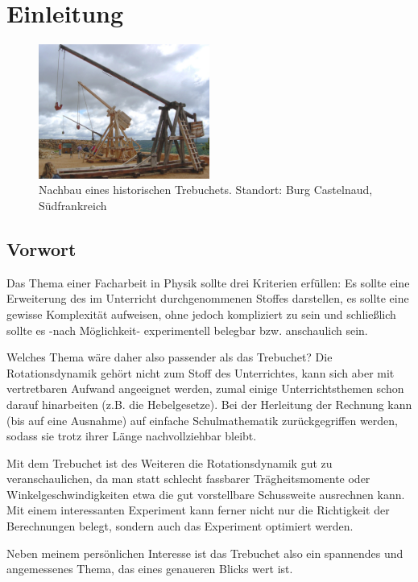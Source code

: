 \chapter{Einleitung}
\begin{figure}[h!]
	\centering
    \includegraphics[width=0.5\textwidth]{bilder/Trebuchet_Castelnaud}
    \caption{Nachbau eines historischen Trebuchets. Standort: Burg Castelnaud, Südfrankreich}
    \label{bild_trebuchet}
\end{figure}

\section{Vorwort}
Das Thema einer Facharbeit in Physik sollte drei Kriterien erfüllen: Es sollte eine Erweiterung des im Unterricht durchgenommenen Stoffes darstellen, es sollte eine gewisse Komplexität aufweisen, ohne jedoch kompliziert zu sein und schließlich sollte es -nach Möglichkeit- experimentell belegbar bzw. anschaulich sein.

Welches Thema wäre daher also passender als das Trebuchet? Die Rotationsdynamik gehört nicht zum Stoff des Unterrichtes, kann sich aber mit vertretbaren Aufwand angeeignet werden, zumal einige Unterrichtsthemen schon darauf hinarbeiten (z.B. die Hebelgesetze). Bei der Herleitung der Rechnung kann (bis auf eine Ausnahme) auf einfache Schulmathematik zurückgegriffen werden, sodass sie trotz ihrer Länge nachvollziehbar bleibt.

Mit dem Trebuchet ist des Weiteren die Rotationsdynamik gut zu veranschaulichen, da man statt schlecht fassbarer Trägheitsmomente oder Winkelgeschwindigkeiten etwa die gut vorstellbare Schussweite ausrechnen kann. Mit einem interessanten Experiment kann ferner nicht nur die Richtigkeit der Berechnungen belegt, sondern auch das Experiment optimiert werden.

Neben meinem persönlichen Interesse ist das Trebuchet also ein spannendes und angemessenes Thema, das eines genaueren Blicks wert ist.

